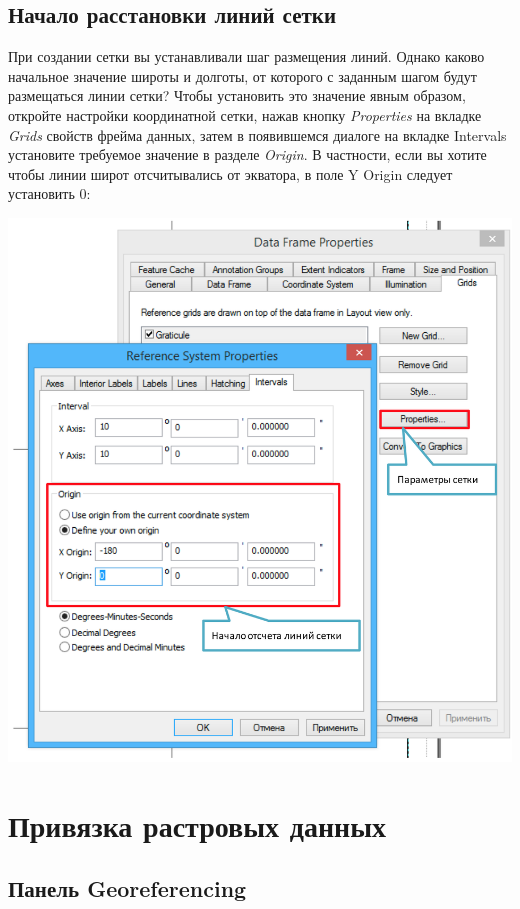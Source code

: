 \documentclass[12pt,]{book}
\begin{document}
\hypertarget{section-41}{%
\section{Начало расстановки линий сетки}\label{section-41}}

При создании сетки вы устанавливали шаг размещения линий. Однако каково начальное значение широты и долготы, от которого с заданным шагом будут размещаться линии сетки? Чтобы установить это значение явным образом, откройте настройки координатной сетки, нажав кнопку \emph{Properties} на вкладке \emph{Grids} свойств фрейма данных, затем в появившемся диалоге на вкладке Intervals установите требуемое значение в разделе \emph{Origin}. В частности, если вы хотите чтобы линии широт отсчитывались от экватора, в поле Y Origin следует установить 0:

\includegraphics{images/Appendix/image67.png}

\hypertarget{manual-georef}{%
\chapter{Привязка растровых данных}\label{manual-georef}}

\hypertarget{georeferencing}{%
\section{Панель Georeferencing}\label{georeferencing}}
\end{document}
